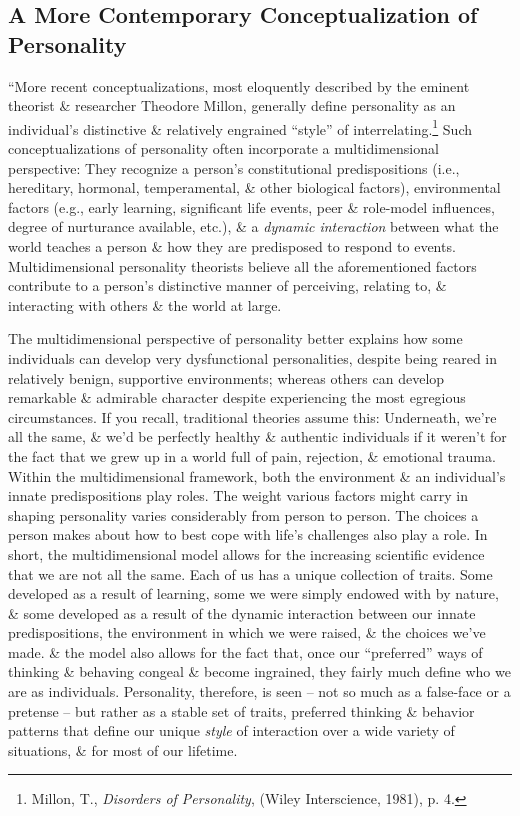 \documentclass{article}
\numberwithin{equation}{section}
\begin{document}
\subsection*{A More Contemporary Conceptualization of Personality}
``More recent conceptualizations, most eloquently described by the eminent theorist \& researcher Theodore Millon, generally define personality as an individual's distinctive \& relatively engrained ``style'' of interrelating.\footnote{Millon, T., \textit{Disorders of Personality}, (Wiley Interscience, 1981), p. 4.} Such conceptualizations of personality often incorporate a multidimensional perspective: They recognize a person's constitutional predispositions (i.e., hereditary, hormonal, temperamental, \& other biological factors), environmental factors (e.g., early learning, significant life events, peer \& role-model influences, degree of nurturance available, etc.), \& a \textit{dynamic interaction} between what the world teaches a person \& how they are predisposed to respond to events. Multidimensional personality theorists believe all the aforementioned factors contribute to a person's distinctive manner of perceiving, relating to, \& interacting with others \& the world at large.

The multidimensional perspective of personality better explains how some individuals can develop very dysfunctional personalities, despite being reared in relatively benign, supportive environments; whereas others can develop remarkable \& admirable character despite experiencing the most egregious circumstances. If you recall, traditional theories assume this: Underneath, we're all the same, \& we'd be perfectly healthy \& authentic individuals if it weren't for the fact that we grew up in a world full of pain, rejection, \& emotional trauma. Within the multidimensional framework, both the environment \& an individual's innate predispositions play roles. The weight various factors might carry in shaping personality varies considerably from person to person. The choices a person makes about how to best cope with life's challenges also play a role. In short, the multidimensional model allows for the increasing scientific evidence that we are not all the same. Each of us has a unique collection of traits. Some developed as a result of learning, some we were simply endowed with by nature, \& some developed as a result of the dynamic interaction between our innate predispositions, the environment in which we were raised, \& the choices we've made. \& the model also allows for the fact that, once our ``preferred'' ways of thinking \& behaving congeal \& become ingrained, they fairly much define who we are as individuals. Personality, therefore, is seen -- not so much as a false-face or a pretense -- but rather as a stable set of traits, preferred thinking \& behavior patterns that define our unique \textit{style} of interaction over a wide variety of situations, \& for most of our lifetime.
\end{document}

